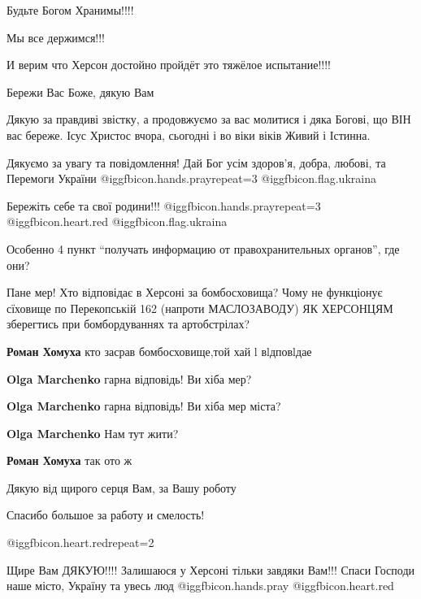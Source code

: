\begin{itemize}
Будьте Богом Хранимы!!!!

Мы все держимся!!!

И верим что Херсон достойно пройдёт это тяжёлое испытание!!!!

Бережи Вас Боже, дякую Вам


Дякую за правдиві звістку, а продовжуємо за вас молитися і дяка Богові, що ВІН
вас береже. Ісус Христос вчора, сьогодні і во віки віків Живий і Істинна.


Дякуємо за увагу та повідомлення! Дай Бог усім здоров'я, добра, любові, та
Перемоги України  @igg{fbicon.hands.pray}{repeat=3} @igg{fbicon.flag.ukraina}

Бережіть себе та свої родини!!! @igg{fbicon.hands.pray}{repeat=3} @igg{fbicon.heart.red} ️@igg{fbicon.flag.ukraina}

Особенно 4 пункт \enquote{получать информацию от правохранительных органов}, где они?


Пане мер! Хто відповідає в Херсоні за бомбосховища? Чому не функціонує сїховище
по Перекопській 162 (напроти МАСЛОЗАВОДУ) ЯК ХЕРСОНЦЯМ зберегтись при
бомбордуваннях та артобстрілах?

\begin{itemize} %
\textbf{Роман Хомуха} кто засрав бомбосховище,той хай l вlдповlдае

\textbf{Olga Marchenko} гарна відповідь! Ви хіба мер?

\textbf{Olga Marchenko} гарна відповідь! Ви хіба мер міста?

\textbf{Olga Marchenko} Нам тут жити?

\textbf{Роман Хомуха} так ото ж
\end{itemize} %


Дякую від щирого серця Вам, за Вашу роботу

Спасибо большое за работу и смелость!

@igg{fbicon.heart.red}{repeat=2}


Щире Вам ДЯКУЮ!!!! Залишаюся у Херсоні тільки завдяки Вам!!! Спаси Господи наше
місто, Україну та увесь люд @igg{fbicon.hands.pray} @igg{fbicon.heart.red}


\end{itemize}
